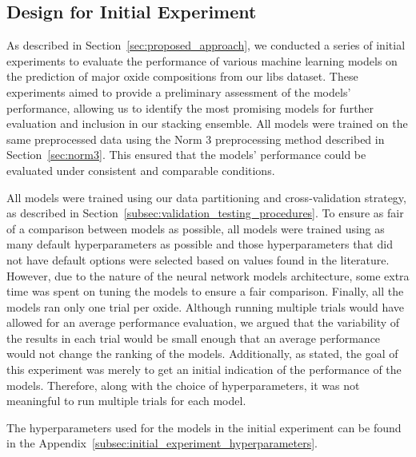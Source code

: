 \subsection{Design for Initial Experiment}\label{sec:initial-experiment}
As described in Section~\ref{sec:proposed_approach}, we conducted a series of initial experiments to evaluate the performance of various machine learning models on the prediction of major oxide compositions from our \gls{libs} dataset.
These experiments aimed to provide a preliminary assessment of the models' performance, allowing us to identify the most promising models for further evaluation and inclusion in our stacking ensemble.
All models were trained on the same preprocessed data using the Norm 3 preprocessing method described in Section~\ref{sec:norm3}.
This ensured that the models' performance could be evaluated under consistent and comparable conditions.

All models were trained using our data partitioning and cross-validation strategy, as described in Section~\ref{subsec:validation_testing_procedures}. 
To ensure as fair of a comparison between models as possible, all models were trained using as many default hyperparameters as possible and those hyperparameters that did not have default options were selected based on values found in the literature.
However, due to the nature of the neural network models architecture, some extra time was spent on tuning the models to ensure a fair comparison.
Finally, all the models ran only one trial per oxide. 
Although running multiple trials would have allowed for an average performance evaluation, we argued that the variability of the results in each trial would be small enough that an average performance would not change the ranking of the models. 
Additionally, as stated, the goal of this experiment was merely to get an initial indication of the performance of the models.
Therefore, along with the choice of hyperparameters, it was not meaningful to run multiple trials for each model.


The hyperparameters used for the models in the initial experiment can be found in the Appendix~\ref{subsec:initial_experiment_hyperparameters}.